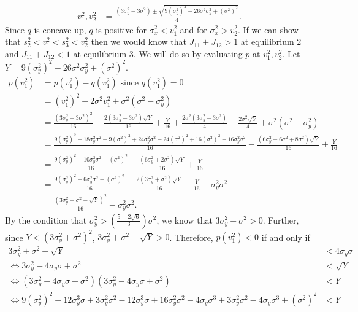 \documentclass{article}
\begin{document}
\begin{enumerate}
\begin{align*}
v_1^2,v_2^2&=\frac{(3\sigma_y^2-3\sigma^2)\pm\sqrt{9(\sigma_y^2)^2-26\sigma^2\sigma_y^2+(\sigma^2)^2}}{4}.
\end{align*}
Since $q$ is concave up, $q$ is positive for $\sigma_x^2<v_1^2$ and for $\sigma_x^2>v_2^2$. If we can show that $s_2^2<v_1^2<s_3^2<v_2^2$ then we would know that $J_{11}+J_{12}>1$ at equilibrium $2$ and $J_{11}+J_{12}<1$ at equilibrium $3$. We will do so by evaluating $p$ at $v_1^2,v_2^2$. Let $Y=9(\sigma_y^2)^2-26\sigma^2\sigma_y^2+(\sigma^2)^2$.
\begin{align*}
p(v_1^2)&=p(v_1^2)-q(v_1^2) \text{ since } q(v_1^2)=0
\\ &=(v_1^2)^2+2\sigma^2v_1^2+\sigma^2(\sigma^2-\sigma_y^2)
\\ &= \frac{(3\sigma_y^2-3\sigma^2)^2}{16}-\frac{2(3\sigma_y^2-3\sigma^2)\sqrt{Y}}{16}+\frac{Y}{16}+\frac{2\sigma^2(3\sigma_y^2-3\sigma^2)}{4}-\frac{2\sigma^2\sqrt{Y}}{4}+\sigma^2(\sigma^2-\sigma_y^2)
\\ &=\frac{9(\sigma_y^2)^2-18\sigma_y^2\sigma^2+9(\sigma^2)^2+24\sigma_y^2\sigma^2-24(\sigma^2)^2+16(\sigma^2)^2-16\sigma_y^2\sigma^2}{16}-\frac{(6\sigma_y^2-6\sigma^2+8\sigma^2)\sqrt{Y}}{16}+\frac{Y}{16}
\\&=\frac{9(\sigma_y^2)^2-10\sigma_y^2\sigma^2+(\sigma^2)^2}{16}-\frac{(6\sigma_y^2+2\sigma^2)\sqrt{Y}}{16}+\frac{Y}{16}
\\&=\frac{9(\sigma_y^2)^2+6\sigma_y^2\sigma^2+(\sigma^2)^2}{16}-\frac{2(3\sigma_y^2+\sigma^2)\sqrt{Y}}{16}+\frac{Y}{16}-\sigma_y^2\sigma^2
\\&=\frac{(3\sigma_y^2+\sigma^2-\sqrt{Y})^2}{16}-\sigma_y^2\sigma^2.
\end{align*}
By the condition that $\sigma_y^2>\left(\frac{5+2\sqrt{6}}{3}\right)\sigma^2$, we know that $3\sigma_y^2-\sigma^2>0$. Further, since $Y<(3\sigma_y^2+\sigma^2)^2$, $3\sigma_y^2+\sigma^2-\sqrt{Y}>0$. Therefore, $p(v_1^2)<0$ if and only if 
\begin{align*}
3\sigma_y^2+\sigma^2-\sqrt{Y}&<4\sigma_y\sigma
\\ \Leftrightarrow 3\sigma_y^2-4\sigma_y\sigma+\sigma^2&<\sqrt{Y}
\\ \Leftrightarrow (3\sigma_y^2-4\sigma_y\sigma+\sigma^2)(3\sigma_y^2-4\sigma_y\sigma+\sigma^2)&< Y \tag{*} \label{star_tag}
\\ \Leftrightarrow 9(\sigma_y^2)^2-12\sigma_y^3\sigma+3\sigma_y^2\sigma^2-12\sigma_y^3\sigma+16\sigma_y^2\sigma^2-4\sigma_y\sigma^3+3\sigma_y^2\sigma^2-4\sigma_y\sigma^3+(\sigma^2)^2&< Y

\end{align*}
\end{enumerate}
\end{document}
